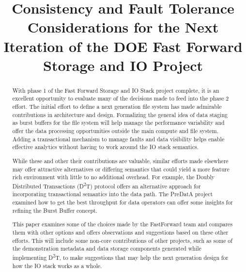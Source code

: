 \documentclass[conference]{IEEEtran}
\newcommand{\DDTns}{D\textsuperscript{2}T}
\begin{document}

\title{Consistency and Fault Tolerance Considerations for the Next Iteration of the DOE Fast Forward Storage and IO Project}

\author{
\and
{}
\and
{}
}
\maketitle

\begin{abstract}
With phase 1 of the Fast Forward Storage and IO Stack project complete, it is
an excellent opportunity to evaluate many of the decisions made to feed into
the phase 2 effort. The initial effort to define a next generation file system
has made admirable contributions in architecture and design. Formalizing the
general idea of data staging as burst buffers for the file system will help
manage the performance variability and offer the data processing opportunities
outside the main compute and file system. Adding a transactional mechanism to
manage faults and data visibility helps enable effective analytics without
having to work around the IO stack semantics.

While these and other their contributions are valuable, similar efforts made
elsewhere may offer attractive alternatives or differing semantics that could
yield a more feature rich environment with little to no additional overhead.
For example, the Doubly Distributed Transactions (\DDTns) protocol offers an
alternative approach for incorporating transactional semantics into the data
path. The PreDatA project examined how to get the best throughput for data
operators can offer some insights for refining the Burst Buffer concept.

This paper examines some of the choices made by the FastForward team and
compares them with other options and offers observations and suggestions based
on these other efforts.  This will include some non-core contributions of other
projects, such as some of the demonstration metadata and data storage
components generated while implementing \DDTns, to make suggestions that may
help the next generation design for how the IO stack works as a whole.

\end{abstract}
\end{document}
